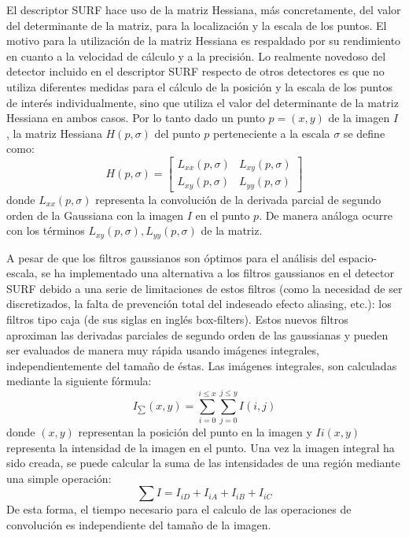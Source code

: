 El descriptor SURF hace uso de la matriz Hessiana, más concretamente, del valor del determinante de la matriz, para la localización y la escala de los puntos. El motivo para la utilización de la matriz Hessiana es respaldado por su rendimiento en cuanto a la velocidad de cálculo y a la precisión. Lo realmente novedoso del detector incluido en el descriptor SURF respecto de otros detectores es que no utiliza diferentes medidas para el cálculo de la posición y la escala de los puntos de interés individualmente, sino que utiliza el valor del determinante de la matriz Hessiana en ambos casos. Por lo tanto dado un punto $p = (x, y)$ de la imagen $I$ , la matriz Hessiana $H (p, \sigma)$ del punto $p$ perteneciente a la escala $\sigma$ se define como:
\begin{equation}
  H (p, \sigma) = 
  \begin{bmatrix}
    L_{xx} (p, \sigma) & L_{xy} (p, \sigma)  \\ 
    L_{xy} (p, \sigma) & L_{yy} (p, \sigma)
  \end{bmatrix}
\end{equation}
donde $L_{xx} (p, \sigma)$ representa la convolución de la derivada parcial de segundo orden de la Gaussiana con la imagen $I$ en el punto $p$. De manera análoga ocurre con los términos $L_{xy} (p, \sigma), L_{yy} (p, \sigma)$ de la matriz. 

A pesar de que los filtros gaussianos son óptimos para el análisis del espacio-escala, se ha implementado una alternativa a los filtros gaussianos en el detector SURF debido a una serie de limitaciones de estos filtros (como la necesidad de ser discretizados, la falta de prevención total del indeseado efecto aliasing, etc.): los filtros tipo caja (de sus siglas en inglés box-filters). Estos nuevos
filtros aproximan las derivadas parciales de segundo orden de las gaussianas y pueden ser evaluados de manera muy rápida usando imágenes integrales, independientemente del tamaño de éstas. Las imágenes integrales, son calculadas mediante la siguiente fórmula:
\begin{equation}
  I_{\sum}(x,y) = \sum_{i=0}^{i\leq x} \sum_{j=0}^{j\leq y} I(i,j)
\end{equation}
donde $(x, y)$ representan la posición del punto en la imagen y $Ii (x, y)$representa la intensidad de la imagen en el punto. Una vez la imagen integral ha sido creada, se puede calcular la suma de
las intensidades de una región mediante una simple operación:
\begin{equation}
  \sum I = I_{iD} + I_{iA} + I_{iB} + I_{iC}
\end{equation}
De esta forma, el tiempo necesario para el calculo de las operaciones de convolución es independiente del tamaño de la imagen.

